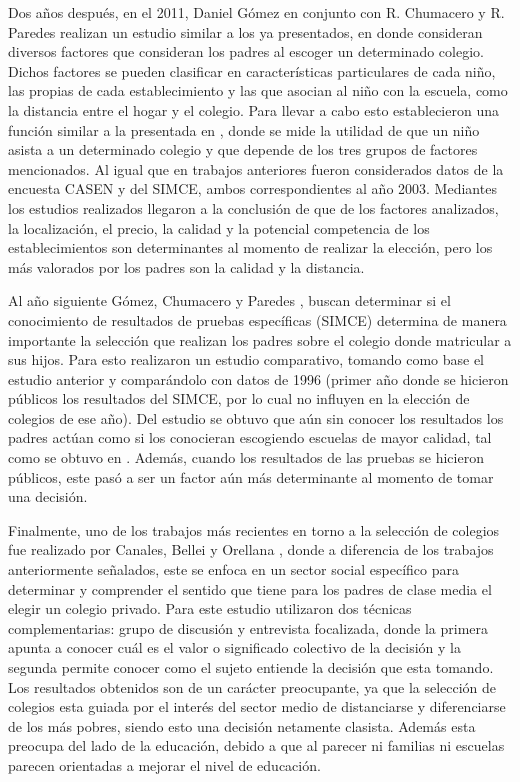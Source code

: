 Dos años después, en el 2011, Daniel Gómez en conjunto con R. Chumacero y R. Paredes \cite{Chumacero20111103} realizan un estudio similar a los ya presentados, en donde consideran diversos factores que consideran los padres al escoger un determinado colegio. Dichos factores se pueden clasificar en características particulares de cada niño, las propias de cada establecimiento y las que asocian al niño con la escuela, como la distancia entre el hogar y el colegio. Para llevar a cabo esto establecieron una función similar a la presentada en \cite{SAPELLI2002}, donde se mide la utilidad de que un niño asista a un determinado colegio y que depende de los tres grupos de factores mencionados. Al igual que en trabajos anteriores fueron considerados datos de la encuesta CASEN y del SIMCE, ambos correspondientes al año 2003. Mediantes los estudios realizados llegaron a la conclusión de que de los factores analizados, la localización, el precio, la calidad y la potencial competencia de los establecimientos son determinantes al momento de realizar la elección, pero los más valorados por los padres son la calidad y la distancia.

Al año siguiente Gómez, Chumacero y Paredes \cite{GOMEZ2012}, buscan determinar si el conocimiento de resultados de pruebas específicas (SIMCE) determina de manera importante la selección que realizan los padres sobre el colegio donde matricular a sus hijos. Para esto realizaron un estudio comparativo, tomando como base el estudio anterior y comparándolo con datos de 1996 (primer año donde se hicieron públicos los resultados del SIMCE, por lo cual no influyen en la elección de colegios de ese año). Del estudio se obtuvo que aún sin conocer los resultados los padres actúan como si los conocieran escogiendo escuelas de mayor calidad, tal como se obtuvo en \cite{SAPELLI2002}. Además, cuando los resultados de las pruebas se hicieron públicos, este pasó a ser un factor aún más determinante al momento de tomar una decisión.

Finalmente, uno de los trabajos más recientes en torno a la selección de colegios fue realizado por Canales, Bellei y Orellana \cite{canalesque}, donde a diferencia de los trabajos anteriormente señalados, este se enfoca en un sector social específico para determinar y comprender el sentido que tiene para los padres de clase media el elegir un colegio privado. Para este estudio utilizaron dos técnicas complementarias: grupo de discusión y entrevista focalizada, donde la primera apunta a conocer cuál es el valor o significado colectivo de la decisión y la segunda permite conocer como el sujeto entiende la decisión que esta tomando. Los resultados obtenidos son de un carácter preocupante, ya que la selección de colegios esta guiada por el interés del sector medio de distanciarse y diferenciarse de los más pobres, siendo esto una decisión netamente clasista. Además esta preocupa del lado de la educación, debido a que al parecer ni familias ni escuelas parecen orientadas a mejorar el nivel de educación.

